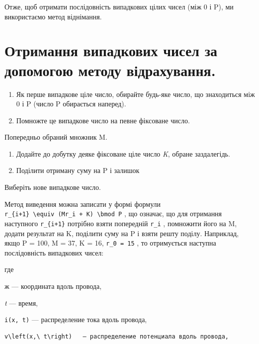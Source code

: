\documentclass[
  ukrainian,
]{article}
\begin{document}
Отже, щоб отримати послідовність випадкових цілих чисел (між 0 і P), ми
використаємо метод віднімання.

\section{Отримання випадкових чисел за допомогою методу
відрахування.}\label{ux43eux442ux440ux438ux43cux430ux43dux43dux44f-ux432ux438ux43fux430ux434ux43aux43eux432ux438ux445-ux447ux438ux441ux435ux43b-ux437ux430-ux434ux43eux43fux43eux43cux43eux433ux43eux44e-ux43cux435ux442ux43eux434ux443-ux432ux456ux434ux440ux430ux445ux443ux432ux430ux43dux43dux44f.}

\begin{enumerate}
\def\labelenumi{\arabic{enumi}.}
\item
  Як перше випадкове ціле число, обирайте будь-яке число, що знаходиться
  між 0 і P (число P обирається наперед).
\item
  Помножте це випадкове число на певне фіксоване число.
\end{enumerate}

Попередньо обраний множник M.

\begin{enumerate}
\def\labelenumi{\arabic{enumi}.}
\setcounter{enumi}{2}
\item
  Додайте до добутку деяке фіксоване ціле число \emph{K}, обране
  заздалегідь.
\item
  Поділити отриману суму на P і залишок
\end{enumerate}

Виберіть нове випадкове число.

Метод виведення можна записати у формі формули
\texttt{r\_\{i+1\}\ \textbackslash{}equiv\ (Mr\_i\ +\ K)\ \textbackslash{}bmod\ P}
, що означає, що для отримання наступного \texttt{r\_\{i+1\}} потрібно
взяти попередній \texttt{r\_i} , помножити його на M, додати результат
на K, поділити суму на P і взяти решту поділу. Наприклад, якщо P = 100,
M = 37, K = 16, \texttt{r\_0\ =\ 15} , то отримується наступна
послідовність випадкових чисел:

где

ж --- координата вдоль провода,

\emph{t} --- время,

\texttt{i(x,\ t)} --- распределение тока вдоль провода,

\begin{verbatim}
v\left(x,\ t\right)   — распределение потенциала вдоль провода,
\end{verbatim}
\end{document}
